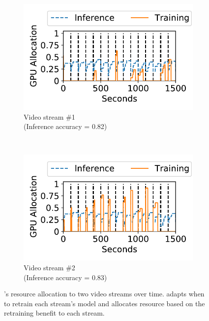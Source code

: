 \begin{figure}
\captionsetup[subfigure]{justification=centering}
  \centering
  \begin{subfigure}[t]{0.45\linewidth}
    \centering
    \includegraphics[width=\linewidth]{ekya/results/multicam/long_video_gpu_allocation_vs_time_cam1.pdf}
    \caption{Video stream \#1 \\(Inference accuracy = 0.82)}
    \label{fig:temporal-video-1}
  \end{subfigure}
  ~
  \begin{subfigure}[t]{0.45\linewidth}
    \centering
    \includegraphics[width=\linewidth]{ekya/results/multicam/long_video_gpu_allocation_vs_time_cam5.pdf} 
    \caption{Video stream \#2 \\(Inference accuracy = 0.83)}
    \label{fig:temporal-video-2}
  \end{subfigure}
  \caption{\name's resource allocation to two video streams over time. \name adapts when to retrain each stream's model and allocates resource based on the retraining benefit to each stream.}
  \label{fig:temporal-resource-allocation}
\end{figure}

